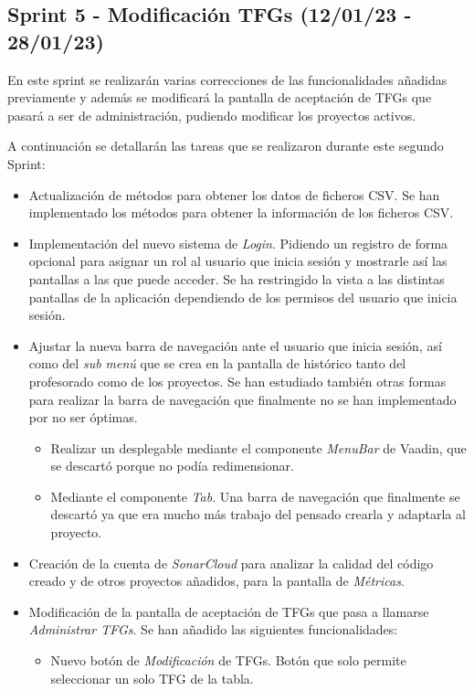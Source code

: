 \subsection{Sprint 5 - Modificación TFGs (12/01/23 - 28/01/23) }

En este sprint se realizarán varias correcciones de las funcionalidades añadidas previamente y además se modificará la pantalla de aceptación de TFGs que pasará a ser de administración, pudiendo modificar los proyectos activos.

A continuación se detallarán las tareas que se realizaron durante este segundo Sprint:

\begin{itemize}
	\item Actualización de métodos para obtener los datos de ficheros CSV. Se han implementado los métodos para obtener la información de los ficheros CSV.
	\item Implementación del nuevo sistema de \emph{Login}. Pidiendo un registro de forma opcional para asignar un rol al usuario que inicia sesión y mostrarle así las pantallas a las que puede acceder. Se ha restringido la vista a las distintas pantallas de la aplicación dependiendo de los permisos del usuario que inicia sesión.
	\item Ajustar la nueva barra de navegación ante el usuario que inicia sesión, así como del \emph{sub menú} que se crea en la pantalla de histórico tanto del profesorado como de los proyectos. Se han estudiado también otras formas para realizar la barra de navegación que finalmente no se han implementado por no ser óptimas.
	\begin{itemize}
		\item Realizar un desplegable mediante el componente \emph{MenuBar} de Vaadin, que se descartó porque no podía redimensionar.
		\item Mediante el componente \emph{Tab}. Una barra de navegación que finalmente se descartó ya que era mucho más trabajo del pensado crearla y adaptarla al proyecto.
	\end{itemize}		
	\item Creación de la cuenta de \emph{SonarCloud} para analizar la calidad del código creado y de otros proyectos añadidos, para la pantalla de \emph{Métricas}.
	\item Modificación de la pantalla de aceptación de TFGs que pasa a llamarse \emph{Administrar TFGs}. Se han añadido las siguientes funcionalidades:
	\begin{itemize}
		\item Nuevo botón de \emph{Modificación} de TFGs. Botón que solo permite seleccionar un solo TFG de la tabla.

\end{itemize}
\end{itemize}
